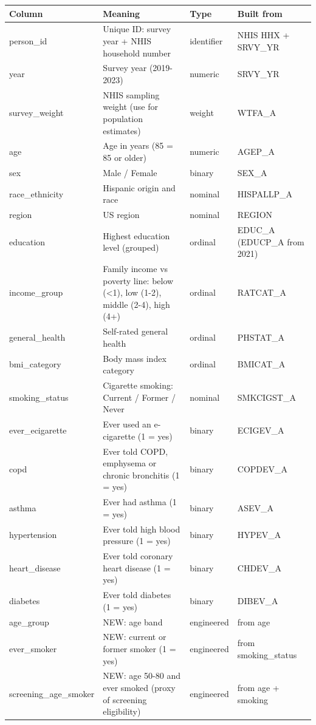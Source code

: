 \begin{tabularx}{\textwidth}{>{\raggedright\arraybackslash}p{3.8cm} >{\raggedright\arraybackslash}X l >{\raggedright\arraybackslash}p{3.4cm}}
\toprule
Column & Meaning & Type & Built from \\
\midrule
person\_id & Unique ID: survey year + NHIS household number & identifier & NHIS HHX + SRVY\_YR \\
year & Survey year (2019-2023) & numeric & SRVY\_YR \\
survey\_weight & NHIS sampling weight (use for population estimates) & weight & WTFA\_A \\
age & Age in years (85 = 85 or older) & numeric & AGEP\_A \\
sex & Male / Female & binary & SEX\_A \\
race\_ethnicity & Hispanic origin and race & nominal & HISPALLP\_A \\
region & US region & nominal & REGION \\
education & Highest education level (grouped) & ordinal & EDUC\_A (EDUCP\_A from 2021) \\
income\_group & Family income vs poverty line: below (<1), low (1-2), middle (2-4), high (4+) & ordinal & RATCAT\_A \\
general\_health & Self-rated general health & ordinal & PHSTAT\_A \\
bmi\_category & Body mass index category & ordinal & BMICAT\_A \\
smoking\_status & Cigarette smoking: Current / Former / Never & nominal & SMKCIGST\_A \\
ever\_ecigarette & Ever used an e-cigarette (1 = yes) & binary & ECIGEV\_A \\
copd & Ever told COPD, emphysema or chronic bronchitis (1 = yes) & binary & COPDEV\_A \\
asthma & Ever had asthma (1 = yes) & binary & ASEV\_A \\
hypertension & Ever told high blood pressure (1 = yes) & binary & HYPEV\_A \\
heart\_disease & Ever told coronary heart disease (1 = yes) & binary & CHDEV\_A \\
diabetes & Ever told diabetes (1 = yes) & binary & DIBEV\_A \\
age\_group & NEW: age band & engineered & from age \\
ever\_smoker & NEW: current or former smoker (1 = yes) & engineered & from smoking\_status \\
screening\_age\_smoker & NEW: age 50-80 and ever smoked (proxy of screening eligibility) & engineered & from age + smoking \\

\end{tabularx}

